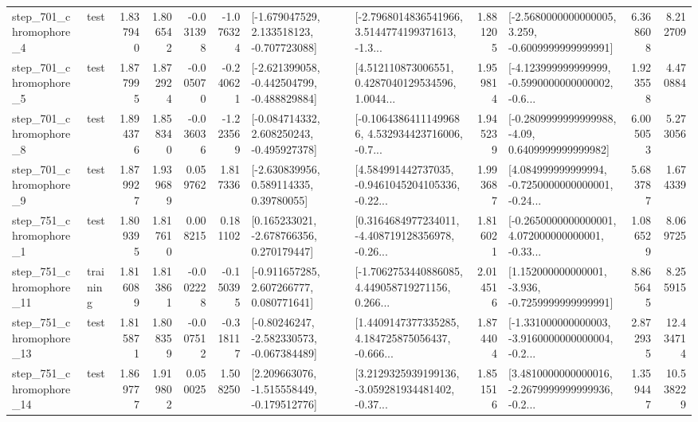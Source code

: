 \begin{tabular}{llrrrrllrlrr}
   step\_701\_chromophore\_4 &      test &      1.837940 &    1.806542 &     -0.031398 & -1.076324 &   [-1.679047529, 2.133518123, -0.707723088] &  [-2.7968014836541966, 3.5144774199371613, -1.3... &       1.881205 &  [-2.5680000000000005, 3.259, -0.6009999999999991] &            6.368608 &          8.212709 \\
   step\_701\_chromophore\_5 &      test &      1.877995 &    1.872924 &     -0.005070 & -0.240621 &  [-2.621399058, -0.442504799, -0.488829884] &  [4.512110873006551, 0.4287040129534596, 1.0044... &       1.959814 &  [-4.123999999999999, -0.5990000000000002, -0.6... &            1.923558 &          4.470884 \\
   step\_701\_chromophore\_8 &      test &      1.894376 &    1.858340 &     -0.036036 & -1.223569 &   [-0.084714332, 2.608250243, -0.495927378] &  [-0.10643864111499686, 4.532934423716006, -0.7... &       1.945239 &   [-0.2809999999999988, -4.09, 0.6409999999999982] &            6.005053 &          5.273056 \\
   step\_701\_chromophore\_9 &      test &      1.879927 &    1.939689 &      0.059762 &  1.817336 &     [-2.630839956, 0.589114335, 0.39780055] &  [4.584991442737035, -0.9461045204105336, -0.22... &       1.993687 &  [4.084999999999994, -0.7250000000000001, -0.24... &            5.683787 &          1.674339 \\
   step\_751\_chromophore\_1 &      test &      1.809395 &    1.817610 &      0.008215 &  0.181102 &    [0.165233021, -2.678766356, 0.270179447] &  [0.3164684977234011, -4.408719128356978, -0.26... &       1.816021 &  [-0.2650000000000001, 4.072000000000001, -0.33... &            1.086529 &          8.069725 \\
  step\_751\_chromophore\_11 &  training &      1.816089 &    1.813861 &     -0.002228 & -0.150395 &    [-0.911657285, 2.607266777, 0.080771641] &  [-1.7062753440886085, 4.449058719271156, 0.266... &       2.014516 &   [1.152000000000001, -3.936, -0.7259999999999991] &            8.865645 &          8.255915 \\
  step\_751\_chromophore\_13 &      test &      1.815871 &    1.808359 &     -0.007512 & -0.318117 &   [-0.80246247, -2.582330573, -0.067384489] &  [1.4409147377335285, 4.184725875056437, -0.666... &       1.874404 &  [-1.331000000000003, -3.9160000000000004, -0.2... &            2.872935 &         12.434714 \\
  step\_751\_chromophore\_14 &      test &      1.869777 &    1.919802 &      0.050025 &  1.508250 &   [2.209663076, -1.515558449, -0.179512776] &  [3.2129325939199136, -3.059281934481402, -0.37... &       1.851516 &  [3.4810000000000016, -2.2679999999999936, -0.2... &            1.359447 &         10.538229 \\

\end{tabular}
